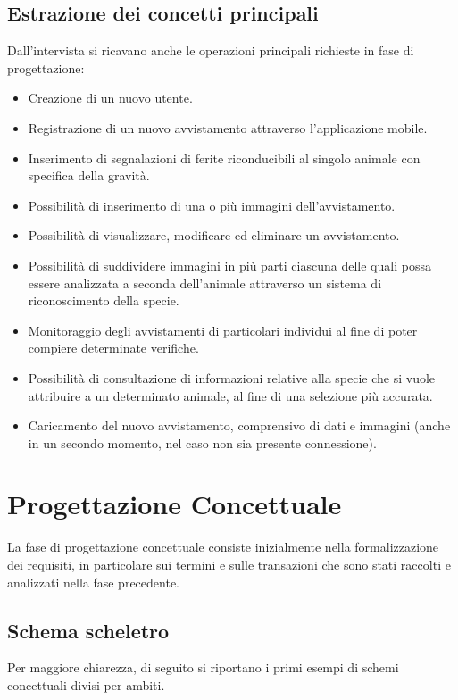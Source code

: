 \documentclass[a4paper,final,12pt]{report}
\begin{document}
\subsection{Estrazione dei concetti principali}
Dall'intervista si ricavano anche le operazioni principali richieste in fase di progettazione:
\begin{itemize}
\item Creazione di un nuovo utente.
\item Registrazione di un nuovo avvistamento attraverso l'applicazione mobile.
\item Inserimento di segnalazioni di ferite riconducibili al singolo animale con specifica della gravità.
\item Possibilità di inserimento di una o più immagini dell'avvistamento.
\item Possibilità di visualizzare, modificare ed eliminare un avvistamento.
\item Possibilità di suddividere immagini in più parti  ciascuna delle quali possa essere analizzata a seconda dell'animale attraverso un sistema di riconoscimento della specie.
\item Monitoraggio degli avvistamenti di particolari individui al fine di poter compiere determinate verifiche.
\item Possibilità di consultazione di informazioni relative alla specie che si vuole attribuire a un determinato animale, al fine di una selezione più accurata.
\item Caricamento  del nuovo avvistamento, comprensivo di dati e immagini (anche in un secondo momento, nel caso non sia presente connessione).
\end{itemize}

\section{Progettazione Concettuale}
La fase di progettazione concettuale consiste inizialmente nella formalizzazione dei requisiti, in particolare sui termini e sulle transazioni che sono stati raccolti e analizzati nella fase precedente.

\subsection{Schema scheletro}
Per maggiore chiarezza, di seguito si riportano i primi esempi di schemi concettuali divisi per ambiti.
\end{document}
